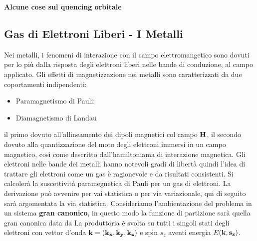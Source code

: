 
\textbf{Alcune cose sul quencing orbitale}

\subsection{Gas di Elettroni Liberi - I Metalli}
Nei metalli, i fenomeni di interazione con il campo elettromangetico sono dovuti per lo più dalla risposta degli elettroni liberi nelle bande di conduzione, al campo applicato. Gli effetti di magnetizzazione nei metalli sono caratterizzati da due coportamenti indipendenti:
\begin{itemize}
	\item Paramagnetismo di Pauli;
	\item Diamagnetismo di Landau
\end{itemize}
il primo dovuto all'allineamento dei dipoli magnetici col campo $\it\bf{H} $, il secondo 
dovuto alla quantizzazione del moto degli elettroni immersi in un campo magnetico, 
così come descritto dall'hamiltoniama di interazione magnetica. Gli elettroni nelle 
bande dei metalli hanno notevoli gradi di libertà quindi l'idea di trattare gli 
elettroni come un gas è ragionevole e da risultati consistenti. Si calcolerà la 
suscettività paramegnetica di Pauli per un gas di elettroni. La derivazione può avvenire 
per vai statistica o per via variazionale, qui di seguito sarà argomentata la via 
statistica. Consideriamo l'ambientazione del problema in un sistema \textbf{gran 
canonico}, in questo modo la funzione di partizione sarà quella gran canonica data da
La produttoria è svolta su tutti i singoli stati degli elettroni con vettor d'onda 
$\it\bf{k} = \left(k_x,k_y,k_z\right)$ e spin $s_z$ aventi energia $E(\it\bf{k} ,s_z)$.


